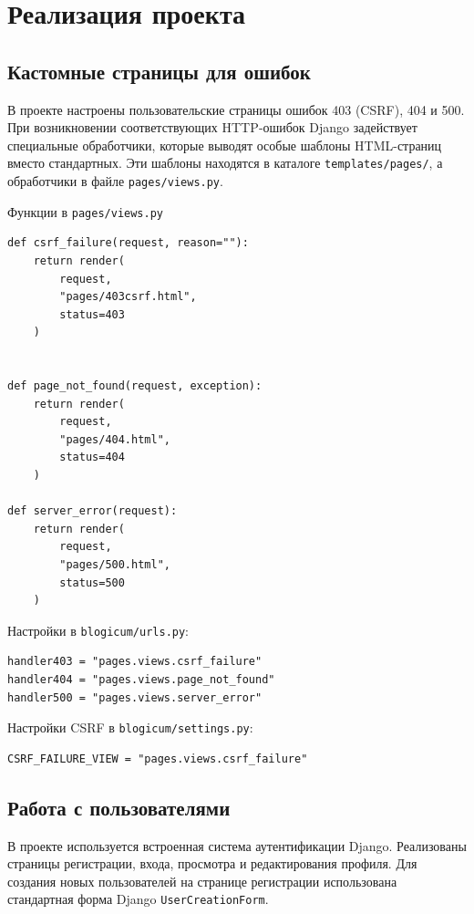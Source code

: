 \documentclass[bachelor, och, pract]{../SCWorks}
\begin{document}
\section{Реализация проекта}
\subsection{Кастомные страницы для ошибок}

В проекте настроены пользовательские страницы ошибок 403 (CSRF), 404 и 500. 
При возникновении соответствующих HTTP‑ошибок Django задействует специальные обработчики, которые выводят особые шаблоны HTML-страниц вместо стандартных.
Эти шаблоны находятся в каталоге \texttt{templates/pages/}, а обработчики в файле \texttt{pages/views.py}.

Функции в \texttt{pages/views.py}

\begin{lstlisting}
def csrf_failure(request, reason=""):
    return render(
        request,
        "pages/403csrf.html",
        status=403
    )


def page_not_found(request, exception):
    return render(
        request,
        "pages/404.html",
        status=404
    )

def server_error(request):
    return render(
        request,
        "pages/500.html",
        status=500
    )
\end{lstlisting}


Настройки в \texttt{blogicum/urls.py}:

\begin{lstlisting}
handler403 = "pages.views.csrf_failure"
handler404 = "pages.views.page_not_found"
handler500 = "pages.views.server_error"
\end{lstlisting}

Настройки CSRF в \texttt{blogicum/settings.py}:

\begin{lstlisting}
CSRF_FAILURE_VIEW = "pages.views.csrf_failure"
\end{lstlisting}

\newpage
\subsection{Работа с пользователями}
В проекте используется встроенная система аутентификации Django. 
Реализованы страницы регистрации, входа, просмотра и редактирования профиля. 
Для создания новых пользователей на странице регистрации использована стандартная форма Django \texttt{UserCreationForm}.
\end{document}
